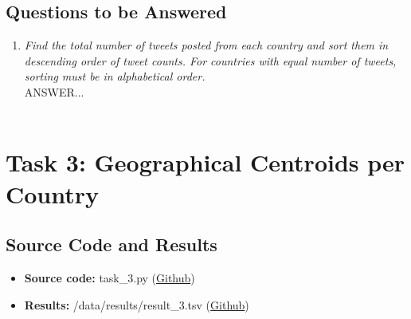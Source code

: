 \documentclass{article}
\begin{document}
\subsection*{Questions to be Answered}
\begin{enumerate}[label=\alph*)]
    \item \textit{Find the total number of tweets posted from each country and sort them in descending order of tweet counts. For countries with equal number of tweets, sorting must be in alphabetical order.}\\
    
    ANSWER...\\ \\
\end{enumerate}


\section*{Task 3: Geographical Centroids per Country}
\subsection*{Source Code and Results}
    \begin{itemize}
        \item \textbf{Source code:} task\_3.py (\href{https://github.com/FredrikBakken/TDT4305_Big-Data-Project/blob/master/PhaseOne/task_3.py}{Github})
        \item \textbf{Results:} /data/results/result\_3.tsv (\href{https://github.com/FredrikBakken/TDT4305_Big-Data-Project/blob/master/PhaseOne/data/results/result_3.tsv}{Github})
    \end{itemize}
\end{document}
